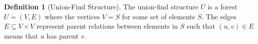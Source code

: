 \documentclass[a4paper,12pt]{article}
\theoremstyle{definition}
\newtheorem{definition}{Definition}[section]
\begin{document}
\begin{definition}[Union-Find Structure]
    The union-find structure $U$ is a forest $U = (V, E)$ where the vertices $V
    = S$ for some set of elements $S$. The edges $E \subseteq V \times V$
    represent parent relations between elements in $S$ such that $(u, v) \in E$
    means that $u$ has parent $v$.
\end{definition}
\end{document}
